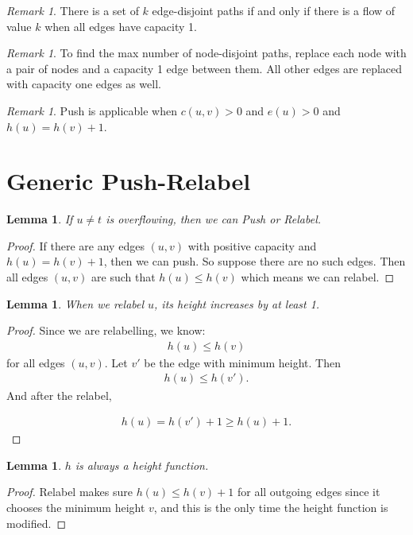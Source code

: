 \documentclass[reqno]{amsbook}
\theoremstyle{plain}
\numberwithin{section}{chapter}
\numberwithin{equation}{chapter}
\newtheorem{lem}[theorem]{Lemma}
\theoremstyle{definition}
\theoremstyle{remark}
\newtheorem{rem}[theorem]{Remark}
\newcommand{\bee}{\begin{equation}\begin{aligned}}
\newcommand{\eee}{\end{aligned}\end{equation}}
\begin{document}
\begin{rem}
There is a set of $k$ edge-disjoint paths if and only if there is a flow of value $k$ when all edges have capacity 1. 
\end{rem}

\begin{rem}
To find the max number of node-disjoint paths, replace each node with a pair of nodes and a capacity 1 edge between them. All other edges are replaced with capacity one edges as well. 
\end{rem}

\begin{rem}
Push is applicable when $c(u,v) > 0$ and $e(u) > 0$ and $h(u) = h(v) + 1$. 
\end{rem}


\section{Generic Push-Relabel}

\begin{lem}\label{lem56}
If $u \neq t$ is overflowing, then we can Push or Relabel. 
\end{lem}

\begin{proof}
If there are any edges $(u,v)$ with positive capacity and $h(u) = h(v) + 1$, then we can push. So suppose there are no such edges. Then all edges $(u,v)$ are such that $h(u) \leq h(v)$ which means we can relabel. 
\end{proof}

\begin{lem}
When we relabel $u$, its height increases by at least 1. 
\end{lem}

\begin{proof}
Since we are relabelling, we know:
\bee
h(u) \leq h(v)
\eee
 for all edges $(u,v)$. Let $v'$ be the edge with minimum height. Then 
 \bee
 h(u) \leq h(v').
 \eee 
 And after the relabel, 
 
 \bee
 h(u) = h(v') + 1 \geq h(u) + 1.
 \eee
\end{proof}

\begin{lem}\label{lem58}
$h$ is always a height function. 
\end{lem}

\begin{proof}
Relabel makes sure $h(u) \leq h(v) + 1$ for all outgoing edges since it chooses the minimum height $v$, and this is the only time the height function is modified. 
\end{proof}
\end{document}
